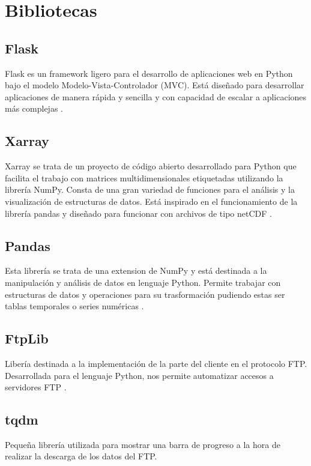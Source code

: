 \section{Bibliotecas}\label{librerias}
	\subsection{Flask}\label{Flask}
Flask es un framework ligero para el desarrollo de aplicaciones web en Python bajo el modelo Modelo-Vista-Controlador (MVC). Está diseñado para desarrollar aplicaciones de manera rápida y sencilla y con capacidad de escalar a aplicaciones más complejas \cite{flask}.
	\subsection{Xarray}\label{xarray}
Xarray se trata de un proyecto de código abierto desarrollado para Python que facilita el trabajo con matrices multidimensionales etiquetadas utilizando la librería NumPy. Consta de una gran variedad de funciones para el análisis y la visualización de estructuras de datos. Está inspirado en el funcionamiento de la librería pandas y diseñado para funcionar con archivos de tipo netCDF \cite{xarray}.	
	\subsection{Pandas}\label{pandas}
Esta librería se trata de una extension de NumPy y está destinada a la manipulación y análisis de datos en lenguaje Python. Permite trabajar con estructuras de datos y operaciones para su trasformación pudiendo estas ser tablas temporales o series numéricas \cite{pandas}.
	\subsection{FtpLib}\label{FtpLib}
Libería destinada a la implementación de la parte del cliente en el protocolo FTP. Desarrollada para el lenguaje Python, nos permite automatizar accesos a servidores FTP \cite{ftp_lib}.
	\subsection{tqdm}\label{tqdm}
Pequeña librería utilizada para mostrar una barra de progreso a la hora de realizar la descarga de los datos del FTP.
